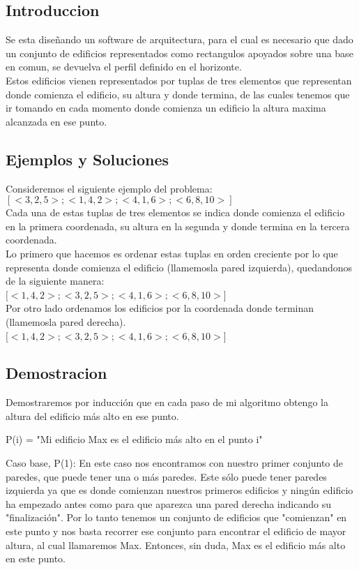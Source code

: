\subsection{Introduccion} 
Se esta diseñando un software de arquitectura, para el cual es necesario que dado un conjunto de edificios representados como rectangulos apoyados sobre una base en comun, se devuelva el perfil definido en el horizonte.\\
Estos edificios vienen representados por tuplas de tres elementos que representan donde comienza el edificio, su altura y donde termina, de las cuales tenemos que ir tomando en cada momento donde comienza un edificio la altura maxima alcanzada en ese punto.

 \subsection{Ejemplos y Soluciones}
 Consideremos el siguiente ejemplo del problema:\\
 $ [<3,2,5>;<1,4,2>;<4,1,6>;<6,8,10>]$ \\
  Cada una de estas tuplas de tres elementos se indica donde comienza el edificio en la primera coordenada, su altura en la segunda y donde termina en la tercera coordenada.\\
  
  Lo primero que hacemos es ordenar estas tuplas en orden creciente por lo que representa donde comienza el edificio (llamemosla pared izquierda), quedandonos de la siguiente manera:\\ 
$[<1,4,2>;<3,2,5>;<4,1,6>;<6,8,10>$] \\

Por otro lado ordenamos los edificios por la coordenada donde terminan (llamemosla pared derecha).\\
$[<1,4,2>;<3,2,5>;<4,1,6>;<6,8,10>$] \\

\subsection{Demostracion}
Demostraremos por inducción que en cada paso de mi algoritmo obtengo la altura del edificio más alto en ese punto.

P(i) = "Mi edificio Max es el edificio más alto en el punto i"

Caso base, P(1):
En este caso nos encontramos con nuestro primer conjunto de paredes, que puede tener una o más paredes. Este sólo puede tener paredes izquierda ya que es donde comienzan nuestros primeros edificios y ningún edificio ha empezado antes como para que aparezca una pared derecha indicando su "finalización". Por lo tanto tenemos un conjunto de edificios que "comienzan" en este punto y nos basta recorrer ese conjunto para encontrar el edificio de mayor altura, al cual llamaremos Max. Entonces, sin duda, Max es el edificio más alto en este punto.

